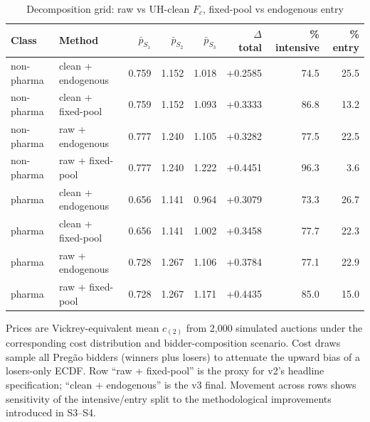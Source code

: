 \begin{table}[htbp]
\centering
\begin{threeparttable}
\caption{Decomposition grid: raw vs UH-clean $F_c$, fixed-pool vs endogenous entry}
\label{tab:v3_decomp_grid}
\small
\begin{tabular}{llrrrrrr}
\toprule
Class & Method & $\bar p_{S_1}$ & $\bar p_{S_2}$ & $\bar p_{S_3}$ & $\Delta$ total & \% intensive & \% entry \\
\midrule
non-pharma & clean + endogenous & 0.759 & 1.152 & 1.018 & +0.2585 & 74.5 & 25.5 \\
non-pharma & clean + fixed-pool & 0.759 & 1.152 & 1.093 & +0.3333 & 86.8 & 13.2 \\
non-pharma & raw + endogenous & 0.777 & 1.240 & 1.105 & +0.3282 & 77.5 & 22.5 \\
non-pharma & raw + fixed-pool & 0.777 & 1.240 & 1.222 & +0.4451 & 96.3 & 3.6 \\
pharma & clean + endogenous & 0.656 & 1.141 & 0.964 & +0.3079 & 73.3 & 26.7 \\
pharma & clean + fixed-pool & 0.656 & 1.141 & 1.002 & +0.3458 & 77.7 & 22.3 \\
pharma & raw + endogenous & 0.728 & 1.267 & 1.106 & +0.3784 & 77.1 & 22.9 \\
pharma & raw + fixed-pool & 0.728 & 1.267 & 1.171 & +0.4435 & 85.0 & 15.0 \\
\bottomrule
\end{tabular}
\begin{tablenotes}\footnotesize
\item Prices are Vickrey-equivalent mean $c_{(2)}$ from 2{,}000
simulated auctions under the corresponding cost distribution and
bidder-composition scenario. Cost draws sample all Preg\~ao
bidders (winners plus losers) to attenuate the upward bias of a
losers-only ECDF. Row ``raw + fixed-pool'' is the proxy for v2's
headline specification; ``clean + endogenous'' is the v3 final.
Movement across rows shows sensitivity of the intensive/entry
split to the methodological improvements introduced in S3--S4.
\end{tablenotes}
\end{threeparttable}
\end{table}
